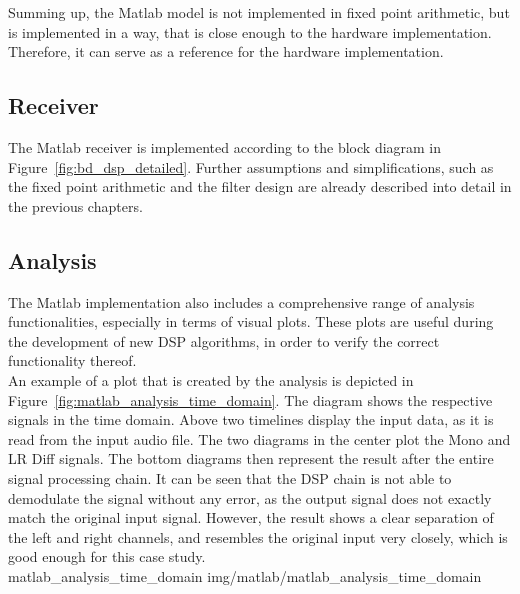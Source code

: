 Summing up, the Matlab model is not implemented in fixed point arithmetic, but is implemented in a way, that is close enough to the hardware implementation.
Therefore, it can serve as a reference for the hardware implementation.


\subsection{Receiver}

The Matlab receiver is implemented according to the block diagram in Figure~\ref{fig:bd_dsp_detailed}.
Further assumptions and simplifications, such as the fixed point arithmetic and the filter design are already described into detail in the previous chapters.

\subsection{Analysis}

The Matlab implementation also includes a comprehensive range of analysis functionalities, especially in terms of visual plots.
These plots are useful during the development of new DSP algorithms, in order to verify the correct functionality thereof.\\

An example of a plot that is created by the analysis is depicted in Figure~\ref{fig:matlab_analysis_time_domain}.
The diagram shows the respective signals in the time domain.
Above two timelines display the input data, as it is read from the input audio file.
The two diagrams in the center plot the Mono and LR Diff signals.
The bottom diagrams then represent the result after the entire signal processing chain.
It can be seen that the DSP chain is not able to demodulate the signal without any error, as the output signal does not exactly match the original input signal.
However, the result shows a clear separation of the left and right channels, and resembles the original input very closely, which is good enough for this case study.\\

 {matlab_analysis_time_domain} {img/matlab/matlab_analysis_time_domain}

